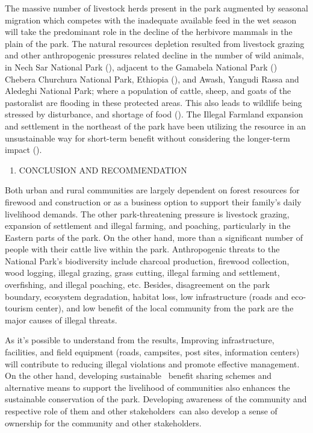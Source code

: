 \documentclass[
  letterpaper,
  DIV=11,
  numbers=noendperiod]{scrartcl}
\providecommand{\tightlist}{%
  \setlength{\itemsep}{0pt}\setlength{\parskip}{0pt}}\usepackage{longtable,booktabs,array}
\begin{document}
The massive number of livestock herds present in the park augmented by
seasonal migration which competes with the inadequate available feed in
the wet season will take the predominant role in the decline of the
herbivore mammals in the plain of the park. The natural resources
depletion resulted from livestock grazing and other anthropogenic
pressures related decline in the number of wild animals, in Nech Sar
National Park (), adjacent
to the Gamabela National Park ()
Chebera Churchura National Park, Ethiopia
(), and
Awash, Yangudi Rassa and Aledeghi National Park; where a population of
cattle, sheep, and goats of the pastoralist are flooding in these
protected areas. This also leads to wildlife being stressed by
disturbance, and shortage of food (). The Illegal Farmland expansion and settlement in the northeast
of the park have been utilizing the resource in an unsustainable way for
short-term benefit without considering the longer-term impact
().

\begin{enumerate}
\def\labelenumi{\arabic{enumi}.}
\setcounter{enumi}{4}
\tightlist
\item
  CONCLUSION AND RECOMMENDATION
\end{enumerate}

Both urban and rural communities are largely dependent on forest
resources for firewood and construction or as a business option to
support their family's daily livelihood demands. The other
park-threatening pressure is livestock grazing, expansion of settlement
and illegal farming, and poaching, particularly in the Eastern parts of
the park. On the other hand, more than a significant number of people
with their cattle live within the park. Anthropogenic threats to the
National Park's biodiversity include charcoal production, firewood
collection, wood logging, illegal grazing, grass cutting, illegal
farming and settlement, overfishing, and illegal poaching, etc. Besides,
disagreement on the park boundary, ecosystem degradation, habitat loss,
low infrastructure (roads and eco-tourism center), and low benefit of
the local community from the park are the major causes of illegal
threats.

As it's possible to understand from the results, Improving
infrastructure, facilities, and field equipment (roads, campsites, post
sites, information centers) will contribute to reducing illegal
violations and promote effective management. On the other hand,
developing sustainable~ benefit sharing schemes and alternative means to
support the livelihood of communities also enhances the sustainable
conservation of the park. Developing awareness of the community and
respective role of them and other stakeholders~can also develop a sense
of ownership for the community and other stakeholders.
\end{document}
